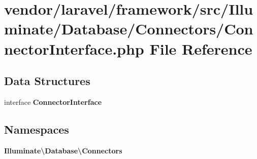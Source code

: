 \section{vendor/laravel/framework/src/\+Illuminate/\+Database/\+Connectors/\+Connector\+Interface.php File Reference}
\label{_database_2_connectors_2_connector_interface_8php}
\subsection*{Data Structures}
\begin{DoxyCompactItemize}
\item 
interface {\bf Connector\+Interface}
\end{DoxyCompactItemize}
\subsection*{Namespaces}
\begin{DoxyCompactItemize}
\item 
 {\bf Illuminate\textbackslash{}\+Database\textbackslash{}\+Connectors}
\end{DoxyCompactItemize}
